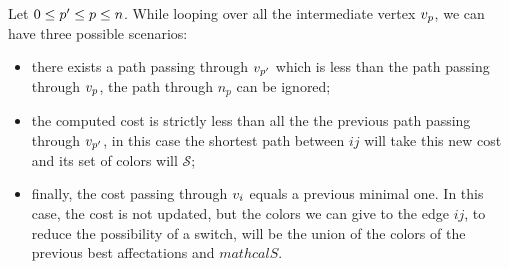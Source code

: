 Let $0 \leq p' \leq p \leq n$. While looping over all the intermediate vertex $v_p$, we can have three possible scenarios:
\begin{itemize}
  \item there exists a path passing through $v_{p'}$ which is less than the path passing through $v_p$, the path through $n_p$ can be ignored;
  \item the computed cost is strictly less than all the the previous path passing through $v_{p'}$, in this case the shortest path between $ij$ will take this new cost and its set of colors will $\mathcal{S}$;
  \item finally, the cost passing through $v_i$ equals a previous minimal one. In this case, the cost is not updated, but the colors we can give to the edge $ij$, to reduce the possibility of a switch, will be the union of the colors of the previous best affectations and $mathcal{S}$.
\end{itemize}

